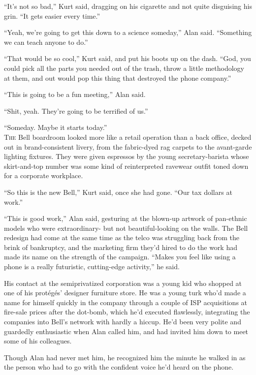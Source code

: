 \documentclass{article}
\begin{document}
``It's not so bad,'' Kurt said, dragging on his cigarette and not
quite disguising his grin.  ``It gets easier every time.''

``Yeah, we're going to get this down to a science someday,'' Alan
said.  ``Something we can teach anyone to do.''

``That would be so cool,'' Kurt said, and put his boots up on the
dash.  ``God, you could pick all the parts you needed out of the
trash, throw a little methodology at them, and out would pop this
thing that destroyed the phone company.''

``This is going to be a fun meeting,'' Alan said.

``Shit, yeah.  They're going to be terrified of us.''

``Someday.  Maybe it starts today.''
\\
\lettrine[lines=3, lhang=.5, nindent=0pt, findent=2pt]{T}{he} Bell boardroom looked more like a retail operation than a back
office, decked out in brand-consistent livery, from the fabric-dyed
rag carpets to the avant-garde lighting fixtures.  They were given
espressos by the young secretary-barista whose skirt-and-top number
was some kind of reinterpreted ravewear outfit toned down for a
corporate workplace.

``So this is the new Bell,'' Kurt said, once she had gone.  ``Our tax
dollars at work.''

``This is good work,'' Alan said, gesturing at the blown-up artwork of
pan-ethnic models who were extraordinary- but not beautiful-looking on
the walls.  The Bell redesign had come at the same time as the telco
was struggling back from the brink of bankruptcy, and the marketing
firm they'd hired to do the work had made its name on the strength of
the campaign.  ``Makes you feel like using a phone is a really
futuristic, cutting-edge activity,'' he said.

His contact at the semiprivatized corporation was a young kid who
shopped at one of his prot\'{e}g\'{e}s' designer furniture store.  He
was a young turk who'd made a name for himself quickly in the company
through a couple of ISP acquisitions at fire-sale prices after the
dot-bomb, which he'd executed flawlessly, integrating the companies
into Bell's network with hardly a hiccup.  He'd been very polite and
guardedly enthusiastic when Alan called him, and had invited him down
to meet some of his colleagues.

Though Alan had never met him, he recognized him the minute he walked
in as the person who had to go with the confident voice he'd heard on
the phone.
\end{document}
